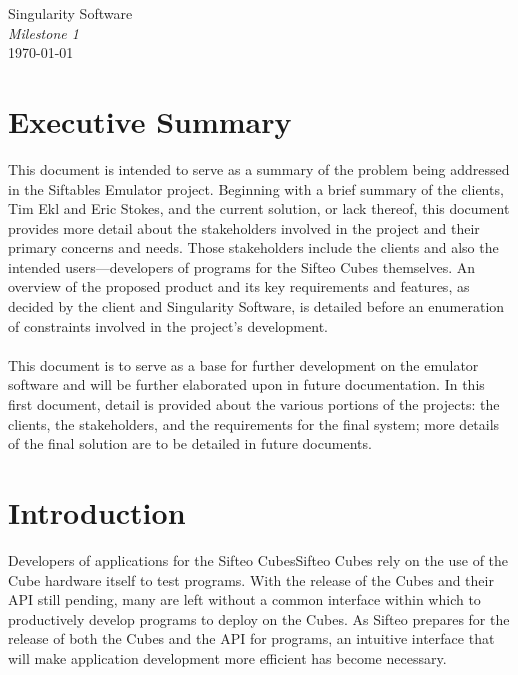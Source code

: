 \documentclass[12pt]{article}
\begin{document}
\vspace*{\fill}
        \begin{center}
                \LARGE{Singularity Software} \\
                \LARGE{\textit{Milestone 1}} \\
                \vspace{.15in}
                \large{\today} \\
        \end{center}
\vspace*{\fill}
\thispagestyle{empty}

\clearpage

\tableofcontents

\clearpage
        
\section{Executive Summary}
This document is intended to serve as a summary of the problem being addressed in the Siftables Emulator project.  Beginning with a brief summary of the clients, Tim Ekl and Eric Stokes, and the current solution, or lack thereof, this document provides more detail about the stakeholders involved in the project and their primary concerns and needs.  Those stakeholders include the clients and also the intended users---developers of programs for the Sifteo Cubes themselves.  An overview of the proposed product and its key requirements and features, as decided by the client and Singularity Software, is detailed before an enumeration of constraints involved in the project's development. \\\\
This document is to serve as a base for further development on the emulator software and will be further elaborated upon in future documentation.  In this first document, detail is provided about the various portions of the projects: the clients, the stakeholders, and the requirements for the final system; more details of the final solution are to be detailed in future documents.

\section{Introduction}
Developers of applications for the Sifteo Cubes\gls{Sifteo Cubes} rely on the use of the Cube hardware itself to test programs.  With the release of the Cubes and their API still pending, many are left without a common interface within which to productively develop programs to deploy on the Cubes.  As Sifteo prepares for the release of both the Cubes and the API for programs, an intuitive interface that will make application development more efficient has become necessary.
\end{document}
